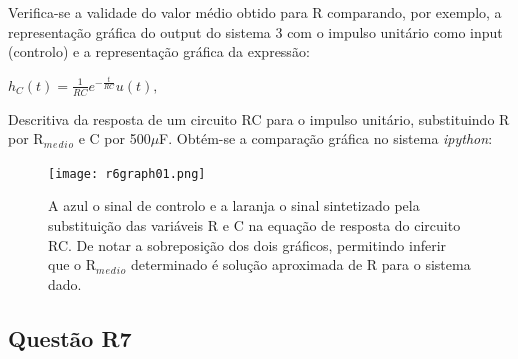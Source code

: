 \documentclass[a4paper,12pt]{article}
\begin{document}
			\newpage
			Verifica-se a validade do valor médio obtido para R comparando, por exemplo, a representação gráfica do output do sistema 3 com o impulso unitário como input (controlo) e a representação gráfica da expressão:\\
			\begin{center}
				\begin{math}
					h_{C}(t)={\frac {1}{RC}}e^{-{\frac {t}{RC}}}u(t),
				\end{math}
			\end{center}
			Descritiva da resposta de um circuito RC para o impulso unitário, substituindo R por R$_m$$_e$$_d$$_i$$_o$ e C por 500$\mu$F.
			Obtém-se a comparação gráfica no sistema \textit{ipython}:
			\begin{figure}[H]
                                    \centering
                                    \captionsetup{justification=centering}
                                  \texttt{[image: r6graph01.png]}
                                  \caption{A azul o sinal de controlo e a laranja o sinal sintetizado pela substituição das variáveis R e C na equação de resposta do circuito RC. De notar a sobreposição dos dois gráficos, permitindo inferir que o R$_m$$_e$$_d$$_i$$_o$ determinado é solução aproximada de R para o sistema dado.}                        \end{figure}
		\newpage
		\subsection{Questão R7}
\end{document}
